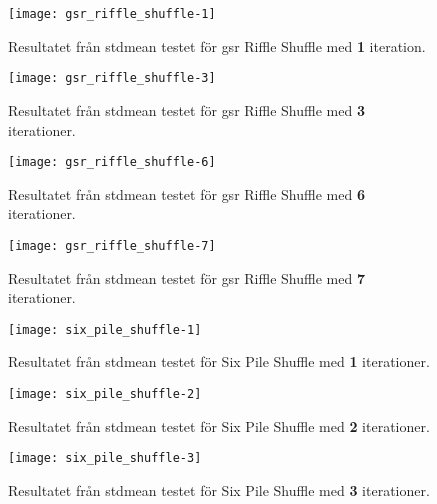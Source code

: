 \begin{figure}[H]
	\centering
	\texttt{[image: gsr\_riffle\_shuffle-1]}
	\captionsetup{width=0.5\textwidth}
	\caption{Resultatet från \gls{stdmean} testet  för \gls{gsr}
	Riffle Shuffle med \textbf{1} iteration.}
	\label{fig:gsr-1}
\end{figure}

\begin{figure}[H]
	\centering
	\texttt{[image: gsr\_riffle\_shuffle-3]} 
	\captionsetup{width=0.5\textwidth}
	\caption{Resultatet från \gls{stdmean} testet  för \gls{gsr}
	Riffle Shuffle med \textbf{3} iterationer.}
	\label{fig:gsr-3}
\end{figure}

\begin{figure}[H]
	\centering
	\texttt{[image: gsr\_riffle\_shuffle-6]} 
	\captionsetup{width=0.5\textwidth}
	\caption{Resultatet från \gls{stdmean} testet  för \gls{gsr} Riffle
	Shuffle med \textbf{6} iterationer.}
	\label{fig:gsr-6}
\end{figure}

\begin{figure}[H]
	\centering
	\texttt{[image: gsr\_riffle\_shuffle-7]} 
	\captionsetup{width=0.5\textwidth}
	\caption{Resultatet från \gls{stdmean} testet för \gls{gsr} Riffle Shuffle
	med \textbf{7} iterationer.}
	\label{fig:gsr-7}
\end{figure}

\begin{figure}[H]
	\centering
	\texttt{[image: six\_pile\_shuffle-1]} 
	\captionsetup{width=0.5\textwidth}
	\caption{Resultatet från \gls{stdmean} testet för Six Pile
	Shuffle med \textbf{1} iterationer.}
	\label{fig:six-1}
\end{figure}

\begin{figure}[H]
	\centering
	\texttt{[image: six\_pile\_shuffle-2]} 
	\captionsetup{width=0.5\textwidth}
	\caption{Resultatet från \gls{stdmean} testet för Six Pile
	Shuffle med \textbf{2} iterationer.}
	\label{fig:six-2}
\end{figure}

\begin{figure}[H]
	\centering
	\texttt{[image: six\_pile\_shuffle-3]} 
	\captionsetup{width=0.5\textwidth}
	\caption{Resultatet från \gls{stdmean} testet för Six Pile
	Shuffle med \textbf{3} iterationer.}
	\label{fig:six-3}
\end{figure}

